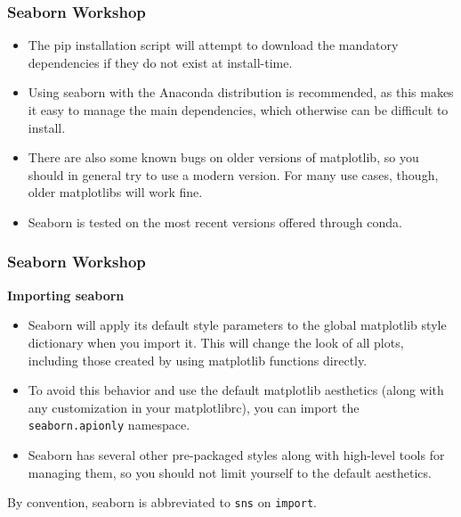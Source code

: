\documentclass{beamer}
\begin{document}
\begin{frame}
\frametitle{Seaborn Workshop}
\large
\begin{itemize}
\item The pip installation script will attempt to download the mandatory dependencies if they do not exist at install-time.
	
\item Using seaborn with the Anaconda distribution is recommended, as this makes it easy to manage the main dependencies, which otherwise can be difficult to install.
	
	
\item There are also some known bugs on older versions of matplotlib, so you should in general try to use a modern version. For many use cases, though, older matplotlibs will work fine.
	
\item Seaborn is tested on the most recent versions offered through conda.
	
\end{itemize}
\end{frame}
\begin{frame}
\frametitle{Seaborn Workshop}
\large

\noindent \textbf{Importing seaborn}
\begin{itemize}
\item	Seaborn will apply its default style parameters to the global matplotlib style dictionary when you import it. This will change the look of all plots, including those created by using matplotlib functions directly. 
\item To avoid this behavior and use the default matplotlib aesthetics (along with any customization in your matplotlibrc), you can import the \texttt{seaborn.apionly} namespace.
	
\item Seaborn has several other pre-packaged styles along with high-level tools for managing them, so you should not limit yourself to the default aesthetics.
	
\end{itemize}

By convention, seaborn is abbreviated to \texttt{sns} on \texttt{import}.
\end{frame}
\end{document}
